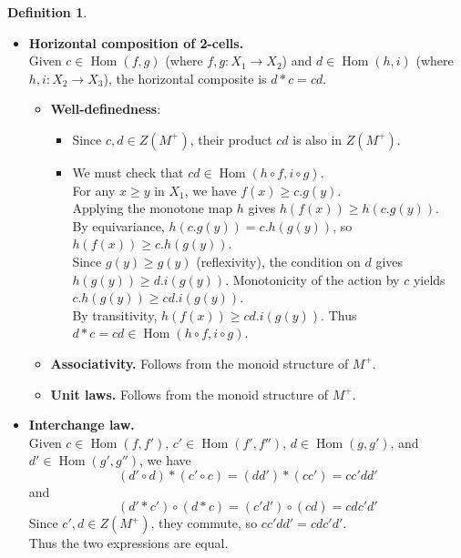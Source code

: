 \documentclass[a4paper,10pt]{article}
\theoremstyle{plain}
\theoremstyle{definition}
\newtheorem{definition}[theorem]{Definition}
\theoremstyle{remark}
\begin{document}
\begin{definition}
\begin{itemize}
            \item \textbf{Horizontal composition of 2-cells.} \\
                  Given \(c \in \operatorname{Hom}(f, g)\) (where \(f, g: X_1 \to X_2\)) and \(d \in \operatorname{Hom}(h, i)\) (where \(h, i: X_2 \to X_3\)), the horizontal composite is \(d * c = cd\).
                  \begin{itemize}
                  \item \textbf{Well-definedness}:
                  \begin{itemize}
                    \item  Since \(c, d \in Z(M^+)\), their product \(cd\) is also in \(Z(M^+)\).
                    \item We must check that \(cd \in \operatorname{Hom}(h \circ f, i \circ g)\).  \\
                          For any \(x \geq y\) in \(X_1\), we have \(f(x) \geq c.g(y)\). \\
                          Applying the monotone map \(h\) gives \(h(f(x)) \geq h(c.g(y))\). \\
                          By equivariance, \(h(c.g(y)) = c.h(g(y))\), so \(h(f(x)) \geq c.h(g(y))\).  \\
                          Since \(g(y) \geq g(y)\) (reflexivity), the condition on \(d\) gives \(h(g(y)) \geq d.i(g(y))\). Monotonicity of the action by \(c\) yields \(c.h(g(y)) \geq cd.i(g(y))\).  \\
                          By transitivity, \(h(f(x)) \geq cd.i(g(y))\). Thus \(d * c = cd \in  \operatorname{Hom}(h \circ f, i \circ g) \).
                  \end{itemize}

            \item \textbf{Associativity.} Follows from the monoid structure of \(M^+\).
            
            \item \textbf{Unit laws.} Follows from the monoid structure of \(M^+\).
          \end{itemize}

            \item \textbf{Interchange law.} \\
                  Given \(c \in \operatorname{Hom}(f, f')\), \(c' \in \operatorname{Hom}(f', f'')\), \(d \in \operatorname{Hom}(g, g')\), and \(d' \in \operatorname{Hom}(g', g'')\), we have
                  \[
                    (d' \circ d) * (c' \circ c) = (dd') * (cc') = cc'dd'
                  \]
                  and
                  \[
                    (d' * c') \circ (d * c) = (c'd') \circ (cd) = cdc'd'
                  \]
                  Since \(c', d \in Z(M^+)\), they commute, so \(cc'dd' = cdc'd'\). \\
                  Thus the two expressions are equal.


\end{itemize}
\end{definition}
\end{document}
